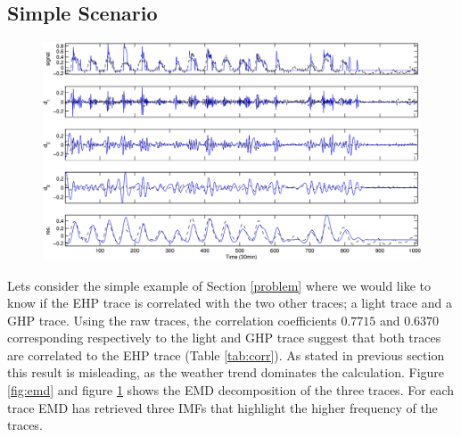 \subsection{Simple Scenario}

\begin{figure}[tb]
\begin{center}
\includegraphics[width=\textwidth]{img/emd_25_41}
\caption{}
\label{fig:emd2}
\end{center}
\end{figure}

Lets consider the simple example of Section \ref{problem} where we would like to know if the EHP trace is correlated with the two other traces; a light trace and a GHP trace.
Using the raw traces, the correlation coefficients $0.7715$ and $0.6370$ corresponding respectively to the light and GHP trace suggest that both traces are correlated to the EHP trace (Table \ref{tab:corr}).
As stated in previous section this result is misleading, as the weather trend dominates the calculation.
Figure \ref{fig:emd} and figure \ref{fig:emd2} shows the EMD decomposition of the three traces.
For each trace EMD has retrieved three IMFs that highlight the higher frequency of the traces.

